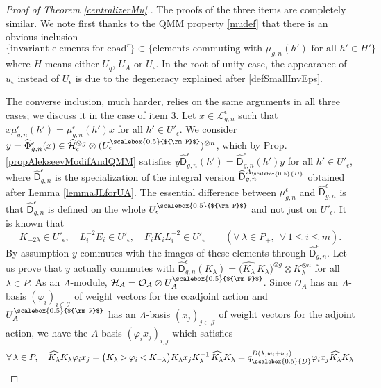 \documentclass[11pt]{amsart}
\newcommand{\e}{\epsilon}
\newcommand{\qD}{q_{\scalebox{0.5}{D}}}
\newcommand{\AD}{A_{\scalebox{0.5}{D}}}
\newcommand{\Pup}{{\scalebox{0.5}{${\rm P}$}}}
\begin{document}
\begin{proof}[Proof of Theorem \ref{centralizerMu}.]
The proofs of the three items are completely similar. We note first thanks to the QMM property \eqref{mudef} that there is an obvious inclusion
\[ \bigl\{ \text{invariant elements for } \mathrm{coad}^r \bigr\} \subset \bigl\{ \text{elements commuting with } \mu_{g,n}(h') \text{ for all } h' \in H' \bigr\} \]
where $H$ means either $U_q$, $U_A$ or $U_\e$. In the root of unity case, the appearance of $u_\e$ instead of $U_\e$ is due to the degeneracy explained after \eqref{defSmallInvEps}. 

The converse inclusion, much harder, relies on the same arguments in all three cases; we discuss it in the case of item 3. Let $x \in \mathcal{L}_{g,n}^{\e}$ such that $x \mu_{g,n}^{\e}(h') = \mu_{g,n}^{\e}(h') x$ for all $h' \in U'_\e$. We consider $y = \widehat{\Phi}_{g,n}^{\e}(x) \in \widehat{\mathcal{H}}_\e^{\otimes g} \otimes (U_\e^\Pup)^{\otimes n}$, which by Prop.\,\ref{propAlekseevModifAndQMM} satisfies $y \widehat{\mathsf{D}}_{g,n}^{\e}(h') = \widehat{\mathsf{D}}_{g,n}^{\e}(h') y$ for all $h' \in U'_\e$, where $\widehat{\mathsf{D}}_{g,n}^{\e}$ is the specialization of the integral version $\widehat{\mathsf{D}}^{\AD}_{g,n}$ obtained after Lemma \ref{lemmaJLforUA}. The essential difference between $\mu_{g,n}^{\e}$ and $\widehat{\mathsf{D}}_{g,n}^{\e}$ is that $\widehat{\mathsf{D}}_{g,n}^{\e}$ is defined on the whole $U_\e^\Pup$ and not just on $U'_\e$. It is known \cite[Proof of Prop.\,2.24]{BR2} that
\begin{equation}\label{commutationYassumption}
K_{-2\lambda} \in U'_\e, \quad L_i^{-2}E_i \in U'_\e, \quad F_iK_iL_i^{-2} \in U'_\e \qquad (\forall \, \lambda \in P_+, \:\: \forall \, 1 \leq i \leq m).
\end{equation}
By assumption $y$ commutes with the images of these elements through $\widehat{\mathsf{D}}_{g,n}^{\e}$. Let us prove that $y$ actually commutes with $\widehat{\mathsf{D}}_{g,n}^{\e}(K_\lambda) = \bigl( \widehat{K_\lambda} \, K_\lambda \bigr)^{\otimes g} \otimes K_\lambda^{\otimes n}$ for all $\lambda \in P$. As an $A$-module, $\mathcal{H}_A = \mathcal{O}_A \otimes U_A^\Pup$. Since $\mathcal{O}_A$ has an $A$-basis $(\varphi_i)_{i \in \mathcal{I}}$ of weight vectors for the coadjoint action \cite[Th.\,2.8]{BR2} and $U_A^\Pup$ has an $A$-basis $(x_j)_{j \in \mathcal{J}}$ of weight vectors for the adjoint action, we have the $A$-basis $(\varphi_i x_j)_{i,j}$ which satisfies
\[ \forall \, \lambda \in P, \quad \widehat{K_{\lambda}}K_{\lambda}\varphi_i x_j = \bigl( K_\lambda \rhd \varphi_i \lhd K_{-\lambda} \bigr) K_\lambda x_j K_\lambda^{-1} \, \widehat{K_{\lambda}}K_{\lambda} = \qD^{D(\lambda,w_i+w_j)}\varphi_i x_j \widehat{K_{\lambda}}K_{\lambda} \]

\end{proof}
\end{document}
